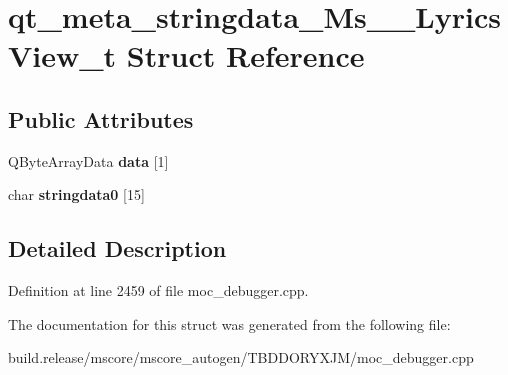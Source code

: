 \hypertarget{structqt__meta__stringdata___ms_____lyrics_view__t}{}\section{qt\+\_\+meta\+\_\+stringdata\+\_\+\+Ms\+\_\+\+\_\+\+Lyrics\+View\+\_\+t Struct Reference}
\label{structqt__meta__stringdata___ms_____lyrics_view__t}
\subsection*{Public Attributes}
\begin{DoxyCompactItemize}
\item 
\mbox{\label{structqt__meta__stringdata___ms_____lyrics_view__t_a60815b3a9a5ba3f53aa98487326805de}} 
Q\+Byte\+Array\+Data {\bfseries data} \mbox{[}1\mbox{]}
\item 
\mbox{\label{structqt__meta__stringdata___ms_____lyrics_view__t_a27684ed05600421dc48875936fe02256}} 
char {\bfseries stringdata0} \mbox{[}15\mbox{]}
\end{DoxyCompactItemize}


\subsection{Detailed Description}


Definition at line 2459 of file moc\+\_\+debugger.\+cpp.



The documentation for this struct was generated from the following file\+:\begin{DoxyCompactItemize}
\item 
build.\+release/mscore/mscore\+\_\+autogen/\+T\+B\+D\+D\+O\+R\+Y\+X\+J\+M/moc\+\_\+debugger.\+cpp\end{DoxyCompactItemize}
